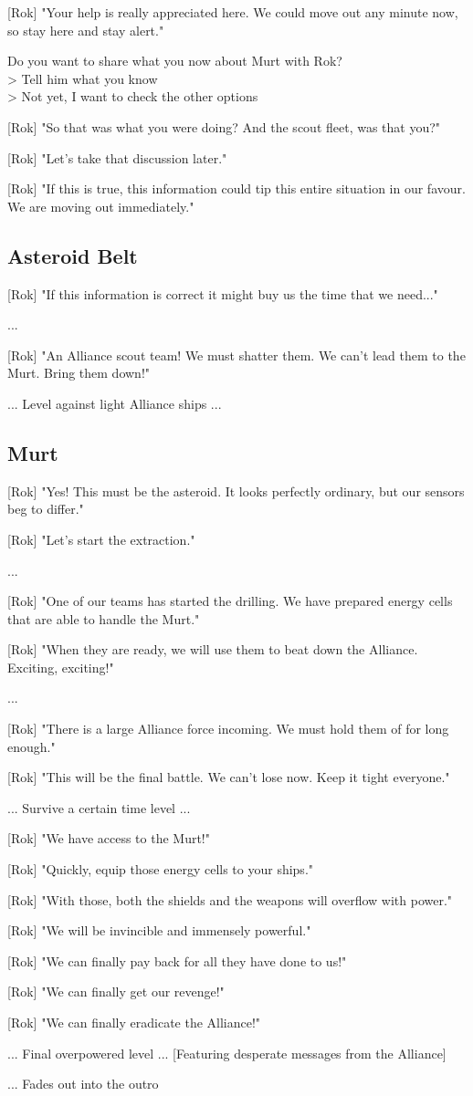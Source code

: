 \documentclass[a4paper,12pt]{article}
\begin{document}
[Rok] "Your help is really appreciated here. We could move out any minute now, so stay here and stay alert."

Do you want to share what you now about Murt with Rok?\\
> Tell him what you know\\
> Not yet, I want to check the other options

[Rok] "So that was what you were doing? And the scout fleet, was that you?"

[Rok] "Let's take that discussion later." 

[Rok] "If this is true, this information could tip this entire situation in our favour. We are moving out immediately."

\subsection{Asteroid Belt}

[Rok] "If this information is correct it might buy us the time that we need..."

...

[Rok] "An Alliance scout team! We must shatter them. We can't lead them to the Murt. Bring them down!"

... Level against light Alliance ships ...

\subsection{Murt}

[Rok] "Yes! This must be the asteroid. It looks perfectly ordinary, but our sensors beg to differ."

[Rok] "Let's start the extraction."

...

[Rok] "One of our teams has started the drilling. We have prepared energy cells that are able to handle the Murt."

[Rok] "When they are ready, we will use them to beat down the Alliance. Exciting, exciting!"

...

[Rok] "There is a large Alliance force incoming. We must hold them of for long enough."

[Rok] "This will be the final battle. We can't lose now. Keep it tight everyone."

... Survive a certain time level ...

[Rok] "We have access to the Murt!" 

[Rok] "Quickly, equip those energy cells to your ships." 

[Rok] "With those, both the shields and the weapons will overflow with power." 

[Rok] "We will be invincible and immensely powerful."

[Rok] "We can finally pay back for all they have done to us!" 

[Rok] "We can finally get our revenge!"

[Rok] "We can finally eradicate the Alliance!"

... Final overpowered level ... [Featuring desperate messages from the Alliance]

... Fades out into the outro
\end{document}
